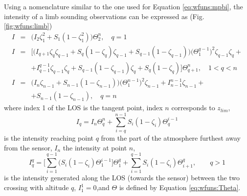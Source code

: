  Using a nomenclature similar to the one used for Equation
 \ref{eq:wfuns:mpbi}, the intensity of a limb sounding
 observations can be expressed as (Fig. \ref{fig:wfuns:limb})
 \begin{eqnarray}
   I & = & \Big(I_2\zeta_1^2+S_1(1-\zeta_1^2) \Big)\Theta^n_{2}, \quad q=1 
        \nonumber \\
   I & = & \Big[\Big(I_{q+1}\zeta_q\zeta_{q-1} +S_q(1-\zeta_q)\zeta_{q-1} + 
           S_{q-1}(1-\zeta_{q-1})\Big)\Big(\Theta^{q-1}_{1}\Big)^2
           \zeta_{q-1}\zeta_q + \nonumber \\
      & & + I_{q-1}^{q-1}\zeta_{q-1}\zeta_q + S_{q-1}(1-\zeta_{q-1})
           \zeta_q + S_q(1-\zeta_q) \Big] \Theta^n_{q+1}, \quad 1<q<n
  \label{eq:wfuns:limb1}  \\
   I & = & \Big(I_n\zeta_{n-1}+S_{n-1}(1-\zeta_{n-1})\Big)\Big
           (\Theta^{n-1}_{1}\Big)^2\zeta_{n-1} + I_{n-1}^{n-1}\zeta_{n-1} +
             \nonumber \\
      & &  +   S_{n-1}(1-\zeta_{n-1}), \quad q=n \nonumber
 \end{eqnarray}
 where index 1 of the LOS is the tangent point, index $n$ corresponds
 to $z_{lim}$, 
 \begin{equation}
   I_q = I_n \Theta^{n}_{q} + \sum_{i=q}^{n-1}S_i(1-\zeta_i) 
             \Theta_{q}^{i-1}
  \label{eq:wfuns:iqq}
 \end{equation}
 is the intensity reaching point $q$ from the part of the
 atmosphere furthest away from the sensor, $I_n$ the intensity at point $n$,
 \begin{equation}
   I_q^q = \Big[ \sum_{i=1}^{q-1}(S_i(1-\zeta_i)\Theta_{1}^{i-1}\Big]
             \Theta_{1}^{q} + \sum_{i=1}^{q-1}S_i(1-\zeta_i)
            \Theta_{i+1}^{q}, \qquad q>1
 \end{equation}
 is the intensity generated along the LOS (towards the sensor) between
 the two crossing with altitude $q$, $I_1^1=0$,and $\Theta$ is defined
 by Equation \ref{eq:wfuns:Theta}.

